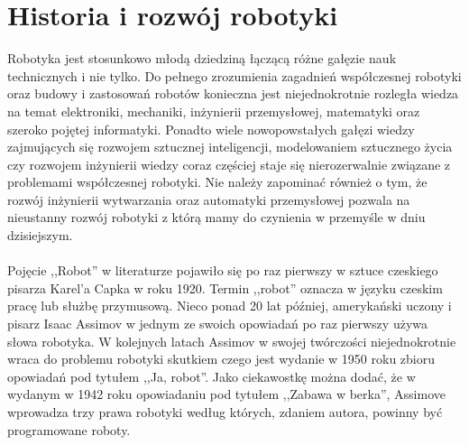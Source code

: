 \section{Historia i rozwój robotyki}
Robotyka jest stosunkowo młodą dziedziną łączącą różne gałęzie nauk technicznych
i nie tylko. Do pełnego zrozumienia zagadnień współczesnej robotyki oraz budowy i
zastosowań robotów konieczna jest niejednokrotnie rozległa wiedza na temat
elektroniki, mechaniki, inżynierii przemysłowej, matematyki oraz szeroko pojętej
informatyki. Ponadto wiele nowopowstałych gałęzi wiedzy zajmujących się rozwojem
sztucznej inteligencji, modelowaniem sztucznego życia czy rozwojem inżynierii
wiedzy coraz częściej staje się nierozerwalnie związane z problemami współczesnej
robotyki. Nie należy zapominać również o tym, że rozwój inżynierii wytwarzania
oraz automatyki przemysłowej pozwala na nieustanny rozwój robotyki z
którą mamy do czynienia w przemyśle w dniu dzisiejszym.\\
\\
Pojęcie ,,Robot'' w literaturze pojawiło się po raz pierwszy w sztuce czeskiego
pisarza Karel'a Capka w roku 1920. Termin ,,robot'' oznacza w języku czeskim
pracę lub służbę przymusową. Nieco ponad 20 lat później, amerykański uczony i
pisarz Isaac Assimov w jednym ze swoich opowiadań po raz pierwszy używa słowa
robotyka. W kolejnych latach Assimov w swojej twórczości niejednokrotnie wraca do
problemu robotyki skutkiem czego jest wydanie w 1950 roku zbioru opowiadań pod
tytułem ,,Ja, robot''. Jako ciekawostkę można dodać, że w wydanym w 1942 roku
opowiadaniu pod tytułem ,,Zabawa w berka'', Assimove wprowadza trzy prawa
robotyki według których, zdaniem autora, powinny być programowane
roboty\cite{Runaround}.

